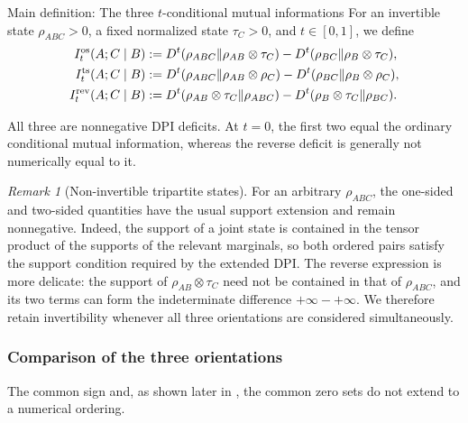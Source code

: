 \documentclass[11pt]{article}
\theoremstyle{remark}
\newtheorem{remark}[remark]{Remark}
\DeclareMathOperator{\os}{os}
\DeclareMathOperator{\ts}{ts}
\DeclareMathOperator{\rev}{rev}
\newcommand{\1}{\mathbbm{1}}
\begin{document}
\begin{mainobject}{Main definition: The three $t$-conditional mutual
informations}
For an invertible state $\rho_{ABC}>0$, a fixed normalized state
$\tau_C>0$, and $t\in[0,1]$, we define
\begin{align}
 I_t^{\os}(A;C\mid B)
 &:=
 D^t(\rho_{ABC}\Vert\rho_{AB}\otimes\tau_C)
 -D^t(\rho_{BC}\Vert\rho_B\otimes\tau_C),\notag\\
 I_t^{\ts}(A;C\mid B)
 &:=
 D^t(\rho_{ABC}\Vert\rho_{AB}\otimes\rho_C)
 -D^t(\rho_{BC}\Vert\rho_B\otimes\rho_C),\notag\\
 I_t^{\rev}(A;C\mid B)
 &:=
 D^t(\rho_{AB}\otimes\tau_C\Vert\rho_{ABC})
 -D^t(\rho_B\otimes\tau_C\Vert\rho_{BC}).
 \label{eq:consolidated-three-CMIs}
\end{align}
\end{mainobject}
All three are nonnegative DPI deficits.  At $t=0$, the first two
equal the ordinary conditional mutual information, whereas the
reverse deficit is generally not numerically equal to it.

\begin{remark}[Non-invertible tripartite states]
For an arbitrary $\rho_{ABC}$, the one-sided and two-sided quantities
have the usual support extension and remain nonnegative.  Indeed, the
support of a joint state is contained in the tensor product of the
supports of the relevant marginals, so both ordered pairs satisfy the
support condition required by the extended DPI.  The reverse
expression is more delicate: the support of
$\rho_{AB}\otimes\tau_C$ need not be contained in that of
$\rho_{ABC}$, and its two terms can form the indeterminate difference
$+\infty-+\infty$.  We therefore retain invertibility whenever all
three orientations are considered simultaneously.
\end{remark}

\subsubsection{Comparison of the three orientations}

The common sign and, as shown later in
, the common zero sets do not
extend to a numerical ordering.
\end{document}
